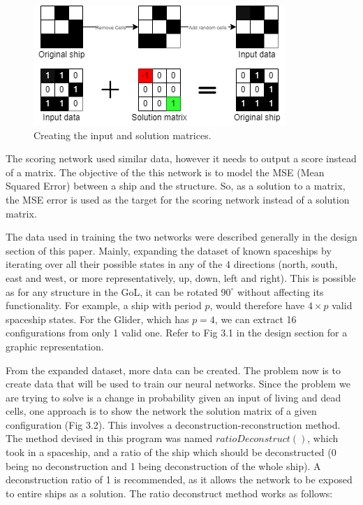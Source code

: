 \documentclass{l4proj}
\begin{document}
\begin{figure}[h]
\centering
\includegraphics[width=\textwidth]{dissertation/images/diagrams/data_augmentation.png} 
\caption{Creating the input and solution matrices.}
\label{fig:subim1}
\end{figure}

The scoring network used similar data, however it needs to output a score instead of a matrix. The objective of the this network is to model the MSE (Mean Squared Error) between a ship and the structure. So, as a solution to a matrix, the MSE error is used as the target for the scoring network instead of a solution matrix. 

The data used in training the two networks were described generally in the design section of this paper. Mainly, expanding the dataset of known spaceships by iterating over all their possible states in any of the 4 directions (north, south, east and west, or more representatively, up, down, left and right). This is possible as for any structure in the GoL, it can be rotated $90^{\circ} $ without affecting its functionality. For example, a ship with period $p$, would therefore have $4 \times p$ valid spaceship states. For the Glider, which has $p = 4$, we can extract 16 configurations from only 1 valid one. Refer to Fig 3.1 in the design section for a graphic representation.

From the expanded dataset, more data can be created. The problem now is to create data that will be used to train our neural networks. Since the problem we are trying to solve is a change in probability given an input of living and dead cells, one approach is to show the network the solution matrix of a given configuration (Fig 3.2). This involves a deconstruction-reconstruction method. The method devised in this program was named $ratioDeconstruct()$, which took in a spaceship, and a ratio of the ship which should be deconstructed (0 being no deconstruction and 1 being deconstruction of the whole ship). A deconstruction ratio of 1 is recommended, as it allows the network to be exposed to entire ships as a solution. The ratio deconstruct method works as follows:
\end{document}
